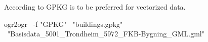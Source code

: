 According to \cite{hame_shapefile_2019} GPKG is to be preferred for vectorized data.

\begin{shellcode}
  ogr2ogr \
    -f "GPKG" \
    "buildings.gpkg" \
    "Basisdata_5001_Trondheim_5972_FKB-Bygning_GML.gml"
\end{shellcode}
